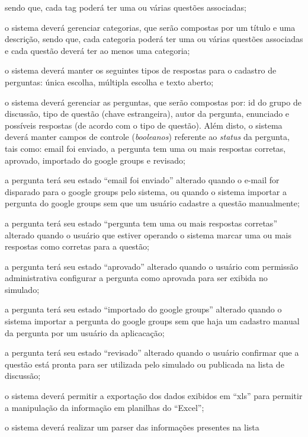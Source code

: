 \begin{alineas}
    sendo que, cada tag poderá ter uma ou várias questões associadas;
    \item o sistema deverá gerenciar categorias, que serão compostas por um
    título e uma descrição, sendo que, cada categoria poderá ter uma ou várias
    questões associadas e cada questão deverá ter ao menos uma categoria;
    \item o sistema deverá manter os seguintes tipos de respostas para o
    cadastro de perguntas: única escolha, múltipla escolha e texto aberto;
    \item o sistema deverá gerenciar as perguntas, que serão compostas por: id
    do grupo de discussão, tipo de questão (chave estrangeira),  autor da
    pergunta, enunciado e possíveis respostas (de acordo com o tipo de questão).
    Além disto, o sistema deverá manter campos de controle (\textit{booleanos})
    referente ao \textit{status} da pergunta, tais como: email foi enviado, a
    pergunta tem uma ou mais respostas corretas, aprovado, importado do google
    groups e revisado;
    \item a pergunta terá seu estado ``email foi enviado'' alterado quando o
    e-mail for disparado para o google groups pelo sistema, ou quando o sistema
    importar a pergunta do google groups sem que um usuário cadastre a questão
    manualmente;
    \item a pergunta terá seu estado ``pergunta tem uma ou mais respostas
    corretas'' alterado quando o usuário que estiver operando o sistema marcar
    uma ou mais respostas como corretas para a questão;
    \item a pergunta terá seu estado ``aprovado'' alterado quando o usuário com
    permissão administrativa configurar a pergunta como aprovada para ser
    exibida no simulado;
    \item a pergunta terá seu estado ``importado do google groups'' alterado
    quando o sistema importar a pergunta do google groups sem que haja um
    cadastro manual da pergunta por um usuário da aplicacação;
    \item a pergunta terá seu estado ``revisado'' alterado quando o usuário
    confirmar que a questão está pronta para ser utilizada pelo simulado ou
    publicada na lista de discussão;
    \item o sistema deverá permitir a exportação dos dados exibidos em ``xls''
    para permitir a manipulação da informação em planilhas do ``Excel'';
    \item o sistema deverá realizar um parser das informações presentes na lista

\end{alineas}
